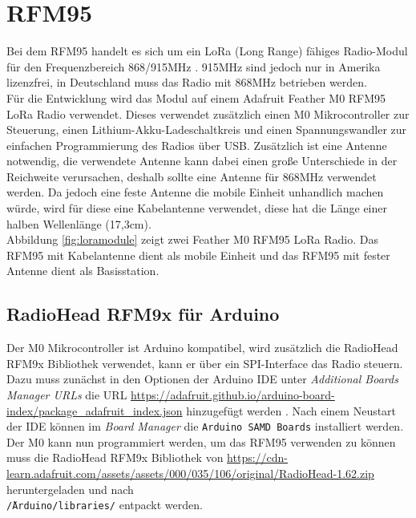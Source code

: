 \section{RFM95}
\label{ch:hardwarechanges:sec:rfm95}
Bei dem RFM95 handelt es sich um ein LoRa (Long Range) fähiges Radio-Modul für den Frequenzbereich 868/915MHz \cite{hope2006rfm}. 
915MHz sind jedoch nur in Amerika lizenzfrei, in Deutschland muss das Radio mit 868MHz betrieben werden.\\
Für die Entwicklung wird das Modul auf einem Adafruit Feather M0 RFM95 LoRa Radio verwendet.
Dieses verwendet zusätzlich einen M0 Mikrocontroller zur Steuerung, einen Lithium-Akku-Ladeschaltkreis und einen Spannungswandler zur einfachen Programmierung des Radios über USB.
Zusätzlich ist eine Antenne notwendig, die verwendete Antenne kann dabei einen große Unterschiede in der Reichweite verursachen, deshalb sollte eine Antenne für 868MHz verwendet werden.
Da jedoch eine feste Antenne die mobile Einheit unhandlich machen würde, wird für diese eine Kabelantenne verwendet, diese hat die Länge einer halben Wellenlänge (17,3cm).\\
Abbildung \ref{fig:loramodule} zeigt zwei Feather M0 RFM95 LoRa Radio. 
Das RFM95 mit Kabelantenne dient als mobile Einheit und das RFM95 mit fester Antenne dient als Basisstation.

\subsection{RadioHead RFM9x für Arduino}
Der M0 Mikrocontroller ist Arduino kompatibel, wird zusätzlich die RadioHead RFM9x Bibliothek verwendet, kann er über ein SPI-Interface das Radio steuern.
Dazu muss zunächst in den Optionen der Arduino IDE unter \textit{Additional Boards Manager URLs} die URL \url{https://adafruit.github.io/arduino-board-index/package_adafruit_index.json} hinzugefügt werden \cite{treece2016lora}.
Nach einem Neustart der IDE können im \textit{Board Manager} die \texttt{Arduino SAMD Boards} installiert werden. 
Der M0 kann nun programmiert werden, um das RFM95 verwenden zu können muss die RadioHead RFM9x Bibliothek von \url{https://cdn-learn.adafruit.com/assets/assets/000/035/106/original/RadioHead-1.62.zip} heruntergeladen und nach \\\texttt{\~/Arduino/libraries/} entpackt werden.

